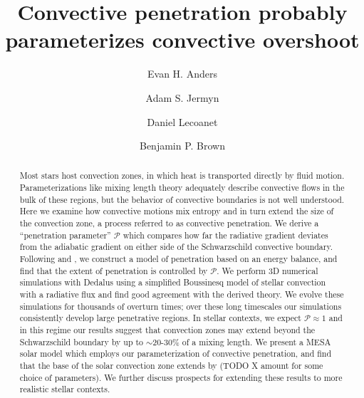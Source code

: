 \documentclass[twocolumn]{aastex631}
\newcommand{\mP}{\ensuremath{\mathcal{P}}}
\begin{document}
\title{Convective penetration probably parameterizes convective overshoot}
\author[0000-0002-3433-4733]{Evan H. Anders}
\author[0000-0001-5048-9973]{Adam S. Jermyn}
\author[0000-0002-7635-9728]{Daniel Lecoanet}
\author[0000-0001-8935-219X]{Benjamin P. Brown}


\begin{abstract}
Most stars host convection zones, in which heat is transported directly by fluid motion.
Parameterizations like mixing length theory adequately describe convective flows in the bulk of these regions, but the behavior of convective boundaries is not well understood.
Here we examine how convective motions mix entropy and in turn extend the size of the convection zone, a process referred to as convective penetration.
We derive a ``penetration parameter'' $\mP$ which compares how far the radiative gradient deviates from the adiabatic gradient on either side of the Schwarzschild convective boundary.
Following \citet{roxburgh1989} and \citet{zahn1991}, we construct a model of penetration based on an energy balance, and find that the extent of penetration is controlled by $\mP$.
We perform 3D numerical simulations with Dedalus using a simplified Boussinesq model of stellar convection with a radiative flux and find good agreement with the derived theory.
We evolve these simulations for thousands of overturn times; over these long timescales our simulations consistently develop large penetrative regions.
In stellar contexts, we expect $\mathcal{P} \approx 1$ and in this regime our results suggest that convection zones may extend beyond the Schwarzschild boundary by up to $\sim$20-30\% of a mixing length.
We present a MESA solar model which employs our parameterization of convective penetration, and find that the base of the solar convection zone extends by (TODO X amount for some choice of parameters).
We further discuss prospects for extending these results to more realistic stellar contexts.
\end{abstract}
\end{document}
